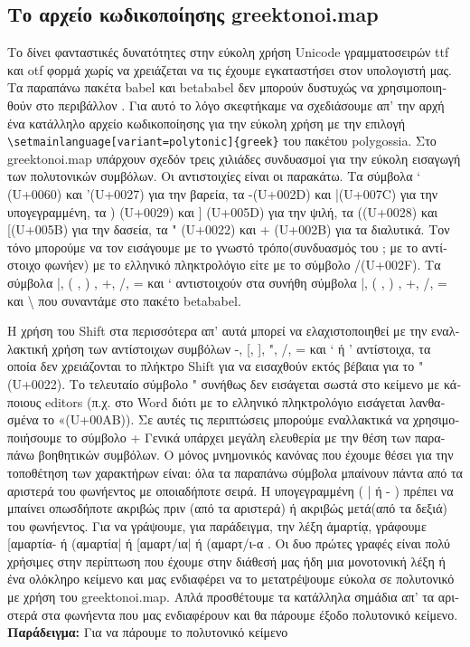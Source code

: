\documentclass{article}
\let\tb=\textbackslash
\begin{document}
\begin{greek}
\section{\textgreek{Το αρχείο κωδικοποίησης {\sf greektonoi.map}}}

Το \XeTeX{}  δίνει φανταστικές δυνατότητες στην εύκολη χρήση Unicode γραμματοσειρών ttf και otf φορμά χωρίς να χρειάζεται να τις έχουμε εγκαταστήσει στον υπολογιστή μας. Τα παραπάνω πακέτα \textsf{babel} και \textsf{betababel} δεν μπορούν δυστυχώς να χρησιμοποιηθούν στο περιβάλλον \XeTeX.  Για αυτό το λόγο σκεφτήκαμε να σχεδιάσουμε απ’ την αρχή ένα κατάλληλο αρχείο κωδικοποίησης για την εύκολη χρήση με την επιλογή \verb'\setmainlanguage[variant=polytonic]{greek}'
 του πακέτου \textsf{polygossia}. 
Στο \textsf{greektonoi.map} υπάρχουν σχεδόν τρεις χιλιάδες συνδυασμοί για την εύκολη εισαγωγή των πολυτονικών συμβόλων. Οι αντιστοιχίες είναι οι παρακάτω. Τα σύμβολα  ` (U+0060) και '(U+0027)  για την βαρεία,  τα -(U+002D) και |(U+007C) για την υπογεγραμμένη,  τα  ) (U+0029) και ] (U+005D) για την ψιλή,  τα  ((U+0028) και [(U+005B) για την δασεία,  τα  "  (U+0022) και + (U+002B) για τα διαλυτικά. Τον τόνο μπορούμε να τον εισάγουμε με το γνωστό τρόπο(συνδυασμός του ; με το αντίστοιχο φωνήεν)  με το  ελληνικό πληκτρολόγιο είτε με το σύμβολο /(U+002F). Τα σύμβολα |, ( , ) , +, /, = και ` αντιστοιχούν στα συνήθη σύμβολα |, ( , ) , +, /, = και \tb{}  που συναντάμε στο πακέτο \textsf{betababel}.

  H  χρήση του \textsf{Shift} στα περισσότερα απ’ αυτά μπορεί να ελαχιστοποιηθεί με την εναλλακτική χρήση των αντίστοιχων συμβόλων -, [, ], ", /, = και ` ή '  αντίστοιχα, τα οποία δεν χρειάζονται το πλήκτρο \textsf{Shift} για να εισαχθούν εκτός βέβαια για  το  "(U+0022). Το τελευταίο σύμβολο " συνήθως δεν εισάγεται σωστά στο κείμενο με κάποιους editors (π.χ. στο Word διότι με το ελληνικό πληκτρολόγιο εισάγεται λανθασμένα το «(U+00AB)). Σε αυτές τις περιπτώσεις μπορούμε εναλλακτικά να χρησιμοποιήσουμε το σύμβολο + Γενικά υπάρχει μεγάλη  ελευθερία με την θέση των παραπάνω βοηθητικών συμβόλων. Ο μόνος μνημονικός κανόνας που έχουμε θέσει για την τοποθέτηση των χαρακτήρων είναι: όλα τα παραπάνω σύμβολα μπαίνουν πάντα από τα αριστερά του φωνήεντος με οποιαδήποτε σειρά. Η υπογεγραμμένη ( | ή - ) πρέπει να μπαίνει οπωσδήποτε ακριβώς πριν (από τα αριστερά) ή ακριβώς μετά(από τα δεξιά) του φωνήεντος.  
Για να γράψουμε, για παράδειγμα,  την λέξη  ἁμαρτίᾳ,  γράφουμε [αμαρτία- ή (αμαρτία| ή [αμαρτ/ια|  ή (αμαρτ/ι-α . Οι δυο πρώτες γραφές είναι πολύ χρήσιμες στην περίπτωση που έχουμε στην διάθεσή μας ήδη μια μονοτονική λέξη ή ένα ολόκληρο κείμενο και μας ενδιαφέρει να το μετατρέψουμε εύκολα σε πολυτονικό με χρήση του greektonoi.map. Απλά προσθέτουμε τα κατάλληλα  σημάδια απ' τα αριστερά στα φωνήεντα που μας ενδιαφέρουν και θα πάρουμε έξοδο πολυτονικό κείμενο. 
\vspace{1em}\\ \noindent
{\bf Παράδειγμα:} Για να πάρουμε το πολυτονικό κείμενο 


\end{greek}
\end{document}
